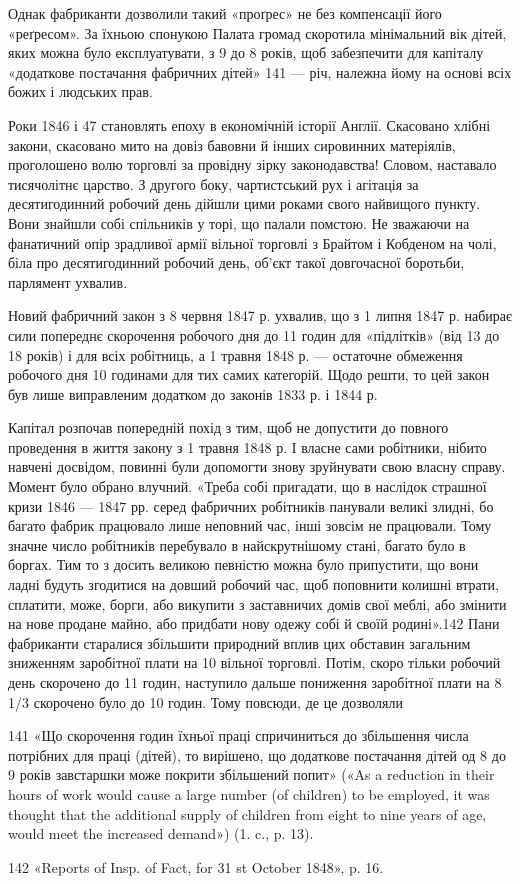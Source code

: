 Однак фабриканти дозволили такий «проґрес» не без компенсації
його «реґресом». За їхньою спонукою Палата громад скоротила
мінімальний вік дітей, яких можна було експлуатувати,
з 9 до 8 років, щоб забезпечити для капіталу «додаткове постачання
фабричних дітей» 141 — річ, належна йому на основі всіх
божих і людських прав.

Роки 1846 і 47 становлять епоху в економічній історії Англії.
Скасовано хлібні закони, скасовано мито на довіз бавовни й
інших сировинних матеріялів, проголошено волю торговлі за
провідну зірку законодавства! Словом, наставало тисячолітнє
царство. З другого боку, чартистський рух і агітація за десятигодинний
робочий день дійшли цими роками свого найвищого
пункту. Вони знайшли собі спільників у торі, що палали помстою.
Не зважаючи на фанатичний опір зрадливої армії вільної торговлі
з Брайтом і Кобденом на чолі, біла про десятигодинний робочий
день, об’єкт такої довгочасної боротьби, парлямент ухвалив.

Новий фабричний закон з 8 червня 1847 р. ухвалив, що з
1 липня 1847 р. набирає сили попереднє скорочення робочого дня
до 11 годин для «підлітків» (від 13 до 18 років) і для всіх робітниць,
а 1 травня 1848 р. — остаточне обмеження робочого
дня 10 годинами для тих самих категорій. Щодо решти, то цей
закон був лише виправленим додатком до законів 1833 р. і 1844 р.

Капітал розпочав попередній похід з тим, щоб не допустити
до повного проведення в життя закону з 1 травня 1848 р. І власне
сами робітники, нібито навчені досвідом, повинні були допомогти
знову зруйнувати свою власну справу. Момент було обрано влучний.
«Треба собі пригадати, що в наслідок страшної кризи 1846 —
1847 рр. серед фабричних робітників панували великі злидні,
бо багато фабрик працювало лише неповний час, інші зовсім не
працювали. Тому значне число робітників перебувало в найскрутнішому
стані, багато було в боргах. Тим то з досить великою
певністю можна було припустити, що вони ладні будуть згодитися
на довший робочий час, щоб поповнити колишні втрати, сплатити,
може, борги, або викупити з заставничих домів свої меблі, або
змінити на нове продане майно, або придбати нову одежу собі й
своїй родині».142 Пани фабриканти старалися збільшити природний
вплив цих обставин загальним зниженням заробітної плати
на 10%
вільної торговлі. Потім, скоро тільки робочий день скорочено
до 11 годин, наступило дальше пониження заробітної плати на
8 1/3%
скорочено було до 10 годин. Тому повсюди, де це дозволяли

141 «Що скорочення годин їхньої праці спричиниться до збільшення
числа потрібних для праці (дітей), то вирішено, що додаткове постачання
дітей од 8 до 9 років завстаршки може покрити збільшений
попит» («As a reduction in their hours of work would cause a large number
(of children) to be employed, it was thought that the additional supply of
children from eight to nine years of age, would meet the increased demand»)
(1. c., p. 13).

142 «Reports of Insp. of Fact, for 31 st October 1848», p. 16.
